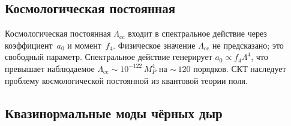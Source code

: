 \documentclass[12pt,a4paper]{article}
\theoremstyle{plain}
\theoremstyle{definition}
\theoremstyle{remark}
\begin{document}
\subsection{Космологическая постоянная}
\label{sec:cc}

Космологическая постоянная $\Lambda_{\mathrm{cc}}$ входит в
спектральное действие через коэффициент~$a_0$ и момент~$f_4$.
Физическое значение $\Lambda_{\mathrm{cc}}$ не предсказано; это
свободный параметр. Спектральное действие генерирует
$a_0 \propto f_4 \Lambda^4$, что превышает наблюдаемое
$\Lambda_{\mathrm{cc}} \sim 10^{-122}\, M_P^4$ на
${\sim}\,120$ порядков. СКТ наследует проблему космологической
постоянной из квантовой теории поля.

\subsection{Квазинормальные моды чёрных дыр}
\label{sec:qnm}
\end{document}
